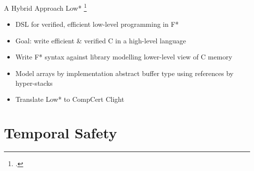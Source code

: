 \documentclass[aspectratio=169]{beamer}
\begin{document}
\begin{frame}{A Hybrid Approach}
Low* \footcite{protzenko_verified_2017}
\begin{itemize}
    \item DSL for verified, efficient low-level programming in F* %
    \item Goal: write efficient \& verified C in a high-level language
    \item Write F* syntax against library modelling lower-level view of C memory
    \item Model arrays by implementation abstract buffer type using references by hyper-stacks %
    \item Translate Low* to CompCert Clight
\end{itemize}
\end{frame}


\section{Temporal Safety}
\end{document}
